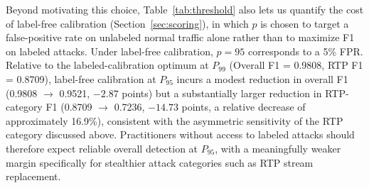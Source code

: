 Beyond motivating this choice, Table~\ref{tab:threshold} also lets us quantify the cost of label-free calibration (Section~\ref{sec:scoring}), in which $p$ is chosen to target a false-positive rate on unlabeled normal traffic alone rather than to maximize F1 on labeled attacks. Under label-free calibration, $p=95$ corresponds to a 5\% FPR. Relative to the labeled-calibration optimum at $P_{99}$ (Overall F1 = 0.9808, RTP F1 = 0.8709), label-free calibration at $P_{95}$ incurs a modest reduction in overall F1 (0.9808 $\rightarrow$ 0.9521, $-2.87$ points) but a substantially larger reduction in RTP-category F1 (0.8709 $\rightarrow$ 0.7236, $-14.73$ points, a relative decrease of approximately 16.9\%), consistent with the asymmetric sensitivity of the RTP category discussed above. Practitioners without access to labeled attacks should therefore expect reliable overall detection at $P_{95}$, with a meaningfully weaker margin specifically for stealthier attack categories such as RTP stream replacement.